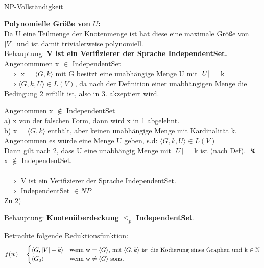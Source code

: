 \documentclass[answers]{submit}
\begin{document}
\begin{exercise}[6]{NP-Vollständigkeit}
{    \textbf{Polynomielle Größe von $U$:} \\

    Da U eine Teilmenge der Knotenmenge ist hat diese eine maximale Größe von $\left\vert V \right\vert$ und ist damit trivialerweise polynomiell.\\

    Behauptung: \textbf{V ist ein Verifizierer der Sprache IndependentSet.} \\

    Angenommmen x $\in$ IndependentSet \\

    $\implies$ x = $\langle G,k \rangle$ mit G besitzt eine unabhängige Menge U mit $\left\vert U \right\vert$ = k \\

    $\implies \langle G,k,U \rangle \in L(V)$, da nach der Definition einer unabhängigen Menge die Bedingung 2 erfüllt ist, also in 3. akzeptiert wird.

    Angenommen x $\notin$ IndependentSet \\

    a) x von der falschen Form, dann wird x in 1 abgelehnt. \\

    b) x = $\langle G,k \rangle$ enthält, aber keinen unabhängige Menge mit Kardinalität k. \\

    Angenommen es würde eine Menge U geben, s.d: $\langle G,k,U \rangle \in L(V)$ \\

    Dann gilt nach 2, dass U eine unabhängig Menge mit $\left\vert U \right\vert$ = k ist (nach Def). $\lightning$ x $\notin$ IndependentSet. \\ \\

    $\implies$ V ist ein Verifizierer der Sprache IndependentSet. \\

    $\implies$ IndependentSet $\in NP$ \\

    Zu 2)

    Behauptung: \textbf{Knotenüberdeckung} $\leq_p$ \textbf{IndependentSet}.

    Betrachte folgende Reduktionsfunktion: \\

    $$f(w)=\begin{cases}
        \langle G,\left\vert V \right\vert-k\rangle & \text{wenn w} = \langle G \rangle \text{, mit } \langle G,k \rangle \text{ ist die Kodierung eines Graphen und k} \in \mathbb{N} \\
        \langle G_0 \rangle        & \text{wenn w} \neq \langle G \rangle \text{ sonst}
      \end{cases}$$ \\

}
\end{exercise}
\end{document}
